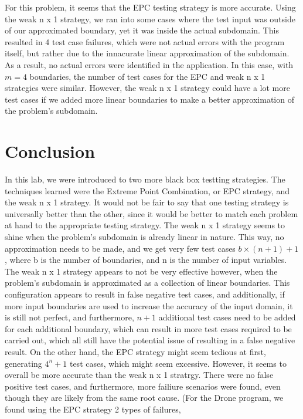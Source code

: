 \documentclass[letterpaper]{article}
\begin{document}
For this problem, it seems that the EPC testing strategy is more accurate.
Using the weak n x 1 strategy, we ran into some cases where the test input
was outside of our approximated boundary, yet it was inside the actual
subdomain. This resulted in 4 test case failures, which were not actual
errors with the program itself, but rather due to the innacurate linear
approximation of the subdomain. As a result, no actual errors were identified 
in the application. In this case, with $m=4$ boundaries, the number of test
cases for the EPC and weak n x 1 strategies were similar. However, 
the weak n x 1 strategy could have a lot more test cases if we added more 
linear boundaries to make a better approximation of the problem's subdomain.

\section{Conclusion}
In this lab, we were introduced to two more black box testting strategies. The
techniques learned were the Extreme Point Combination, or EPC strategy, and the
weak n x 1 strategy. It would not be fair to say that one testing strategy
is universally better than the other, since it would be better to match
each problem at hand to the appropriate testing strategy. The weak n x 1
strategy seems to shine when the problem's subdomain is already linear in
nature. This way, no approximation needs to be made, and we get very few
test cases $b \times (n + 1) + 1$, where b is the number of boundaries, and
n is the number of input variables. The weak n x 1 strategy appears to not
be very effective however, when the problem's subdomain is approximated as
a collection of linear boundaries. This configuration appears to result in
false negative test cases, and additionally, if more input boundaries are
used to increase the accuracy of the input domain, it is still not perfect,
and furthermore, $n + 1$ additional test cases need to be added for each
additional boundary, which can result in more test cases required to be carried
out, which all still have the potential issue of resulting in a false
negative result. On the other hand, the EPC strategy might seem tedious
at first, generating $4^n + 1$ test cases, which might seem excessive.
However, it seems to overall be more accurate than the weak n x 1 stratrgy.
There were no false positive test cases, and furthermore, more failiure
scenarios were found, even though they are likely from the same root cause.
(For the Drone program, we found using the EPC strategy 2 types of failures,
\end{document}
